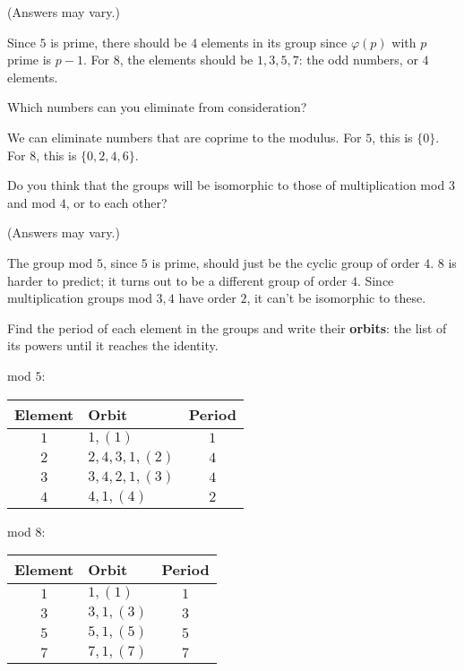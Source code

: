 \documentclass[../key.tex]{subfiles}
\begin{document}
(Answers may vary.)

Since $5$ is prime, there should be $4$ elements in its group since $\varphi(p)$ with $p$ prime is $p-1$. For $8$, the elements should be $1,3,5,7$: the odd numbers, or $4$ elements.

\begin{inner_problem}
\item Which numbers can you eliminate from consideration?
\end{inner_problem}

We can eliminate numbers that are coprime to the modulus. For $5$, this is $\{0\}$. For $8$, this is $\{0,2,4,6\}$.

\begin{inner_problem}
\item Do you think that the groups will be isomorphic to those of multiplication mod $3$ and mod $4$, or to each other?
\end{inner_problem}

(Answers may vary.)

The group mod $5$, since $5$ is prime, should just be the cyclic group of order $4$. $8$ is harder to predict; it turns out to be a different group of order $4$. Since multiplication groups mod $3,4$ have order $2$, it can't be isomorphic to these.

\begin{inner_problem}
\item Find the period of each element in the groups and write their \textbf{orbits}: the list of its powers until it reaches the identity.
\end{inner_problem}

\begin{minipage}{0.45\textwidth}
  mod $5$:

\begin{tabular}{c|l|c}
  Element & Orbit & Period \\ \hline
  $1$ & $1, (1)$ & $1$ \\
  $2$ & $2, 4, 3, 1, (2)$ & $4$ \\
  $3$ & $3, 4, 2, 1, (3)$ & $4$ \\
  $4$ & $4, 1, (4)$ & $2$ \\
\end{tabular}
\end{minipage}\hfill
\begin{minipage}{0.45\textwidth}
mod $8$:
\begin{tabular}{c|l|c}
  Element & Orbit & Period \\ \hline
  $1$ & $1, (1)$ & $1$ \\
  $3$ & $3, 1, (3)$ & $3$ \\
  $5$ & $5, 1, (5)$ & $5$ \\
  $7$ & $7, 1, (7)$ & $7$ \\
\end{tabular}
\end{minipage}
\end{document}
